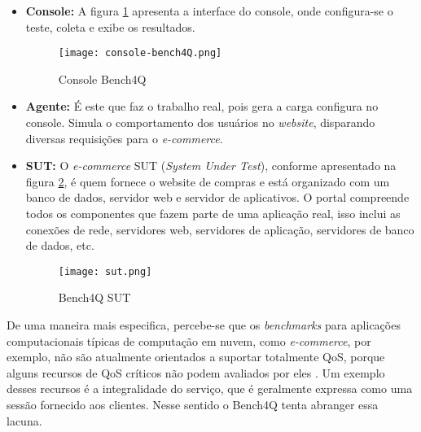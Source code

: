 \begin{itemize}
	
	\item \textbf{Console:} A figura \ref{fig:console-bench4q} apresenta a interface do console, onde configura-se o teste, coleta e exibe os resultados. 
	
	\begin{figure}[!htb]
		\caption{Console Bench4Q}
		\label{fig:console-bench4q}
		\centering
		\texttt{[image: console-bench4Q.png]}
	\end{figure}
	
	\item \textbf{Agente:} É este que faz o trabalho real, pois gera a carga configura no console. Simula o comportamento dos usuários no \textit{website}, disparando diversas requisições para o \textit{e-commerce}. 
	
	\item \textbf{SUT:} O \textit{e-commerce} SUT (\textit{System Under Test}), conforme apresentado na figura \ref{fig:sut},  é quem fornece o website de compras e está organizado com um banco de dados, servidor web e servidor de aplicativos. O portal compreende todos os componentes que fazem parte de uma aplicação real, isso inclui as conexões de rede, servidores web, servidores de aplicação, servidores de banco de dados, etc.
	
	\begin{figure}[htb]
		\caption{Bench4Q SUT}
		\label{fig:sut}
		\centering
		\texttt{[image: sut.png]}
	\end{figure}
	
\end{itemize}

De uma maneira mais especifica, percebe-se que os \textit{benchmarks} para aplicações computacionais típicas de computação em nuvem, como \textit{e-commerce}, por exemplo, não são atualmente orientados a suportar totalmente QoS, porque alguns recursos de QoS críticos não podem avaliados por eles \cite{Zhang2011}. Um exemplo desses recursos é a integralidade do serviço, que é geralmente expressa como uma sessão fornecido aos clientes. Nesse sentido o Bench4Q tenta abranger essa lacuna.


